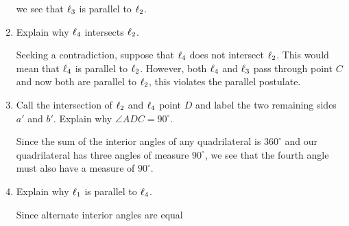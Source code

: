 \documentclass[newpage,hints,handout,noauthor,nooutcomes,12pt]{ximera}
\begin{document}
\begin{problem}
\begin{enumerate}
\begin{freeResponse}
\begin{image}
\end{image}
we see that $\ell_3$ is parallel to $\ell_2$. 
\end{freeResponse}


\item Explain why $\ell_4$ intersects $\ell_2$.

\begin{freeResponse}
  Seeking a contradiction, suppose that $\ell_4$ does not intersect
  $\ell_2$. This would mean that $\ell_4$ is parallel to $\ell_2$. However,
  both $\ell_4$ and $\ell_3$ pass through point $C$ and now both are
  parallel to $\ell_2$, this violates the parallel postulate.
\end{freeResponse}


\item Call the intersection of $\ell_2$ and $\ell_4$ point $D$ and label the two
remaining sides $a'$ and $b'$. Explain why $\angle ADC = 90^\circ$.

\begin{freeResponse}
Since the sum of the interior angles of any quadrilateral is
$360^\circ$ and our quadrilateral has three angles of measure
$90^\circ$, we see that the fourth angle must also have a measure of
$90^\circ$.
\end{freeResponse}



\item Explain why $\ell_1$ is parallel to $\ell_4$.

\begin{freeResponse}
Since alternate interior angles are equal
\begin{image}
\end{image}
\end{freeResponse}
\end{enumerate}
\end{problem}
\end{document}

